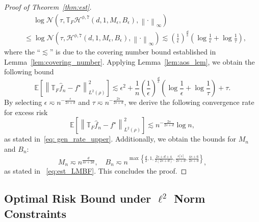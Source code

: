 \documentclass[11pt]{article}
\begin{document}
\begin{proof}[Proof of Theorem~\ref{thm:est}]
\begin{equation}
    \begin{aligned}
        & \quad \; \log \mathcal{N} \left(\tau, \mathbb{T}_{F}\mathcal{H}^{\phi,7}(d, 1, M_{\epsilon}, B_{\epsilon}), \left\|\cdot\right\|_\infty \right) \\
        &\leq \log \mathcal{N} \left(\tau, \mathcal{H}^{\phi,7}(d, 1, M_{\epsilon}, B_{\epsilon}), \left\|\cdot\right\|_\infty \right) \lesssim \left( \frac{1}{\epsilon}\right)^{\frac{d}{s}} \left(\log \frac{1}{\epsilon} + \log \frac{1}{\tau}\right),
    \end{aligned}
    \label{eq:cov-TF}
\end{equation}
where the ``$\lesssim$'' is due to the covering number bound established in Lemma~\ref{lem:covering_number}. Applying Lemma~\ref{lem:aos_lem}, we obtain the following bound
\begin{equation*}
    \mathbb{E}\left[ \left\| \mathbb{T}_{F} \widehat{f}_n - f^{\star}\right\|_{L^2(\rho)}^2  
    \right] \lesssim  \epsilon^2 + \frac{1}{n} \left( \frac{1}{\epsilon}\right)^{\frac{d}{s}} \left(\log \frac{1}{\epsilon} + \log \frac{1}{\tau}\right) + \tau.
\end{equation*}
By selecting $\epsilon \eqsim n^{-\frac{s}{2s + d}}$ and $ \tau \eqsim n^{-\frac{2s}{2s+d}}$, we derive the following convergence rate for excess risk
\begin{equation*}
    \mathbb{E} \left[ \left\| \mathbb{T}_{F} \widehat{f}_n - f^{\star}\right\|_{L^2(\rho)}^2  
    \right] \lesssim n^{-\frac{2s}{2s + d}} \log n,
\end{equation*}
as stated in~\eqref{eq: gen_rate_upper}. Additionally, we obtain the bounds for $M_n$ and $B_n$:
\begin{equation*}
     M_n \eqsim    n^{\frac{d}{4s+2d}} , \quad  B_n \eqsim n^{\max \left\{ \frac{d}{2}, 1, \frac{2s+d+4}{2(2s+d)}, \frac{s \lceil s\rceil}{2s+d},\frac{4s+6}{2s+d} \right\}},
\end{equation*}
as stated in ~\eqref{eq:est_LMBF}. This concludes the proof.
\end{proof}

\subsection{Optimal Risk Bound under \texorpdfstring{$\ell^2$}{l-2} Norm Constraints}
\end{document}
